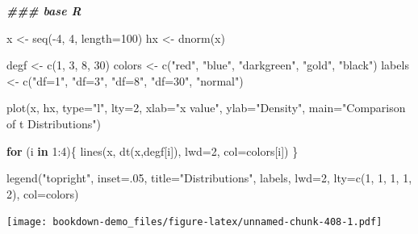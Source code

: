 \documentclass[
]{book}
\newenvironment{Shaded}{\begin{snugshade}}{\end{snugshade}}
\newcommand{\AttributeTok}[1]{\textcolor[rgb]{0.77,0.63,0.00}{#1}}
\newcommand{\ControlFlowTok}[1]{\textcolor[rgb]{0.13,0.29,0.53}{\textbf{#1}}}
\newcommand{\DecValTok}[1]{\textcolor[rgb]{0.00,0.00,0.81}{#1}}
\newcommand{\DocumentationTok}[1]{\textcolor[rgb]{0.56,0.35,0.01}{\textbf{\textit{#1}}}}
\newcommand{\FunctionTok}[1]{\textcolor[rgb]{0.00,0.00,0.00}{#1}}
\newcommand{\NormalTok}[1]{#1}
\newcommand{\OtherTok}[1]{\textcolor[rgb]{0.56,0.35,0.01}{#1}}
\newcommand{\SpecialCharTok}[1]{\textcolor[rgb]{0.00,0.00,0.00}{#1}}
\newcommand{\StringTok}[1]{\textcolor[rgb]{0.31,0.60,0.02}{#1}}
\begin{document}
\begin{Shaded}
\begin{Highlighting}[]
\DocumentationTok{\#\#\# base R}

\NormalTok{x }\OtherTok{\textless{}{-}} \FunctionTok{seq}\NormalTok{(}\SpecialCharTok{{-}}\DecValTok{4}\NormalTok{, }\DecValTok{4}\NormalTok{, }\AttributeTok{length=}\DecValTok{100}\NormalTok{)}
\NormalTok{hx }\OtherTok{\textless{}{-}} \FunctionTok{dnorm}\NormalTok{(x)}

\NormalTok{degf }\OtherTok{\textless{}{-}} \FunctionTok{c}\NormalTok{(}\DecValTok{1}\NormalTok{, }\DecValTok{3}\NormalTok{, }\DecValTok{8}\NormalTok{, }\DecValTok{30}\NormalTok{)}
\NormalTok{colors }\OtherTok{\textless{}{-}} \FunctionTok{c}\NormalTok{(}\StringTok{"red"}\NormalTok{, }\StringTok{"blue"}\NormalTok{, }\StringTok{"darkgreen"}\NormalTok{, }\StringTok{"gold"}\NormalTok{, }\StringTok{"black"}\NormalTok{)}
\NormalTok{labels }\OtherTok{\textless{}{-}} \FunctionTok{c}\NormalTok{(}\StringTok{"df=1"}\NormalTok{, }\StringTok{"df=3"}\NormalTok{, }\StringTok{"df=8"}\NormalTok{, }\StringTok{"df=30"}\NormalTok{, }\StringTok{"normal"}\NormalTok{)}

\FunctionTok{plot}\NormalTok{(x, hx, }\AttributeTok{type=}\StringTok{"l"}\NormalTok{, }\AttributeTok{lty=}\DecValTok{2}\NormalTok{, }\AttributeTok{xlab=}\StringTok{"x value"}\NormalTok{,}
     \AttributeTok{ylab=}\StringTok{"Density"}\NormalTok{, }\AttributeTok{main=}\StringTok{"Comparison of t Distributions"}\NormalTok{)}

\ControlFlowTok{for}\NormalTok{ (i }\ControlFlowTok{in} \DecValTok{1}\SpecialCharTok{:}\DecValTok{4}\NormalTok{)\{}
    \FunctionTok{lines}\NormalTok{(x, }\FunctionTok{dt}\NormalTok{(x,degf[i]), }\AttributeTok{lwd=}\DecValTok{2}\NormalTok{, }\AttributeTok{col=}\NormalTok{colors[i])}
\NormalTok{\}}

\FunctionTok{legend}\NormalTok{(}\StringTok{"topright"}\NormalTok{, }\AttributeTok{inset=}\NormalTok{.}\DecValTok{05}\NormalTok{, }\AttributeTok{title=}\StringTok{"Distributions"}\NormalTok{,}
\NormalTok{       labels, }\AttributeTok{lwd=}\DecValTok{2}\NormalTok{, }\AttributeTok{lty=}\FunctionTok{c}\NormalTok{(}\DecValTok{1}\NormalTok{, }\DecValTok{1}\NormalTok{, }\DecValTok{1}\NormalTok{, }\DecValTok{1}\NormalTok{, }\DecValTok{2}\NormalTok{), }\AttributeTok{col=}\NormalTok{colors)}
\end{Highlighting}
\end{Shaded}

\texttt{[image: bookdown-demo\_files/figure-latex/unnamed-chunk-408-1.pdf]}
\end{document}
